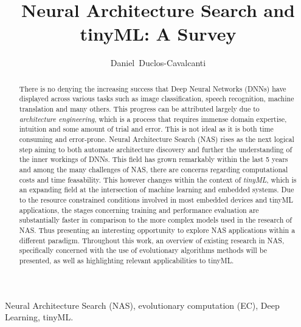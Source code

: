 \documentclass[10pt,        %
               a4paper,     %
               journal,     %
               ]{IEEEtran}
\makeatletter
\def\markboth#1#2{\def\leftmark{\@IEEEcompsoconly{\sffamily}\MakeUppercase{\protect#1}}%
\def\rightmark{\@IEEEcompsoconly{\sffamily}\MakeUppercase{\protect#2}}}
\makeatother
\begin{document}
%
\title{Neural Architecture Search and tinyML: A Survey}
\author{Daniel~Duclos-Cavalcanti}

\markboth{Seminar for VLSI Entwurfsverfahren, Summer Term 2022}%
{Daniel Duclos-Cavalcanti: Network Architecture Search (NAS)}

\maketitle


\begin{abstract}
There is no denying the increasing success that Deep Neural Networks (DNNs)
have displayed across various tasks such as image classification, speech recognition, machine translation
and many others. This progress can be attributed largely due to \textit{architecture engineering},
which is a process that requires immense domain expertise, intuition and some amount of trial
and error. This is not ideal as it is both time consuming and error-prone. Neural Architecture Search (NAS)
rises as the next logical step aiming to both automate architecture discovery and further the understanding
of the inner workings of DNNs. This field has grown remarkably within the last 5 years and among the many challenges
of NAS, there are concerns regarding computational costs and time feasability. This however changes within the context
of \textit{tinyML}, which is an expanding field at the intersection of machine learning and embedded systems.
Due to the resource constrained conditions involved in most embedded devices and tinyML
applications, the stages concerning training and performance evaluation are substantially faster in comparison to
the more complex models used in the research of NAS. Thus presenting an interesting opportunity to explore NAS applications
within a different paradigm. Throughout this work, an overview of existing research in NAS, specifically concerned
with the use of evolutionary algorithms methods will be presented, as well as highlighting relevant applicabilities to tinyML.

\end{abstract}

\begin{IEEEkeywords}
Neural Architecture Search (NAS), evolutionary computation (EC), Deep Learning, tinyML.
\end{IEEEkeywords}
\end{document}
